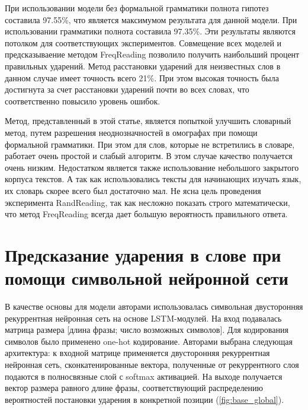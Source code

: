 \documentclass[14pt, a4paper, russian]{extreport}
\begin{document}
При использовании модели без формальной грамматики полнота гипотез составила 97.55\%, что является максимумом результата для данной модели. При использовании грамматики полнота составила 97.35\%. Эти результаты являются потолком для соответствующих экспериментов. Совмещение всех моделей и предсказываение методом FreqReading  позволило получить наибольший процент правильных ударений. Метод расстановки ударений для неизвестных слов в данном случае имеет точность всего 21\%. При этом высокая точность была достигнута за счет расстановки ударений почти во всех словах, что соответственно повысило уровень ошибок. 

Метод, представленный в этой статье, является попыткой улучшить словарный метод, путем разрешения неоднозначностей в омографах при помощи формальной грамматики. При этом для слов, которые не  встретились в словаре, работает очень простой и слабый алгоритм. В этом случае качество получается очень низким. Недостатком является также использование небольшого закрытого корпуса текстов. А так как использовались тексты для начинающих изучать язык, их словарь скорее всего был достаточно мал. Не ясна цель проведения эксперимента RandReading, так как несложно показать строго математически, что метод FreqReading всегда дает большую вероятность правильного ответа.

\section{Предсказание ударения в слове при помощи символьной нейронной сети}
\label{global_desc}
	В качестве основы для модели авторами \cite{ponomareva} использовалась  символьная двусторонняя рекуррентная нейронная сеть на основе LSTM-модулей. На вход подавалась матрица размера [длина фразы; число возможных символов]. Для кодирования символов было применено one-hot кодирование. Авторами выбрана следующая архитектура: к входной матрице применяется двусторонняя рекуррентная нейронная сеть, сконкатенированные вектора, полученные от рекуррентного слоя подаются в полносвязные слой с softmax активацией. На выходе получается вектор размера равного длине фразы, соответствующий распределению вероятностей постановки ударения в конкретной позиции (\cref{fig:base_global}).
\end{document}
